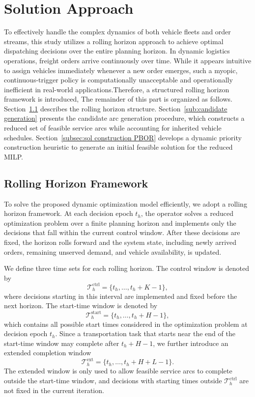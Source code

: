\documentclass[10pt, reqno]{amsart}
\begin{document}
\section{Solution Approach}

To effectively handle the complex dynamics of both vehicle fleets and order streams, this study utilizes a rolling horizon approach to achieve optimal dispatching decisions over the entire planning horizon. In dynamic logistics operations, freight orders arrive continuously over time. While it appears intuitive to assign vehicles immediately whenever a new order emerges, such a myopic, continuous-trigger policy is computationally unacceptable and operationally inefficient in real-world applications.Therefore, a structured rolling horizon framework is introduced, The remainder of this part is organized as follows. Section~\ref{sub:rolling horizon} describes the rolling horizon structure. Section~\ref{sub:candidate generation} presents the candidate arc generation procedure, which constructs a reduced set of feasible service arcs while accounting for inherited vehicle schedules. Section~\ref{subsec:sol construction PBOR} develops a dynamic priority construction heuristic to generate an initial feasible solution for the reduced MILP.

\subsection{Rolling Horizon Framework}\label{sub:rolling horizon}

To solve the proposed dynamic optimization model efficiently, we adopt a rolling horizon framework. At each decision epoch $t_h$, the operator solves a reduced optimization problem over a finite planning horizon and implements only the decisions that fall within the current control window. After these decisions are fixed, the horizon rolls forward and the system state, including newly arrived orders, remaining unserved demand, and vehicle availability, is updated.

We define three time sets for each rolling horizon. The control window is denoted by
\[
\mathcal T_h^{\mathrm{ctrl}}
=
\{t_h,\ldots,t_h+K-1\},
\]
where decisions starting in this interval are implemented and fixed before the next horizon. The start-time window is denoted by
\[
\mathcal T_h^{\mathrm{start}}
=
\{t_h,\ldots,t_h+H-1\},
\]
which contains all possible start times considered in the optimization problem at decision epoch $t_h$. Since a transportation task that starts near the end of the start-time window may complete after $t_h+H-1$, we further introduce an extended completion window
\[
\mathcal T_h^{\mathrm{ext}}
=
\{t_h,\ldots,t_h+H+L-1\}.
\]
The extended window is only used to allow feasible service arcs to complete outside the start-time window, and decisions with starting times outside $\mathcal T_h^{\mathrm{ctrl}}$ are not fixed in the current iteration.
\end{document}
